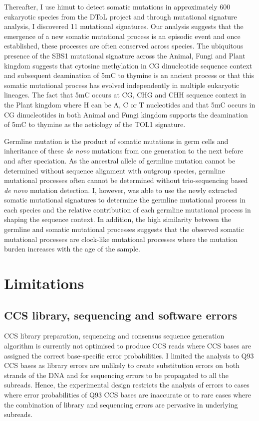 Thereafter, I use himut to detect somatic mutations in approximately 600 eukaryotic species from the DToL project and through mutational signature analysis, I discovered 11 mutational signatures. Our analysis suggests that the emergence of a new somatic mutational process is an episodic event and once established, these processes are often conserved across species. The ubiquitous presence of the SBS1 mutational signature across the Animal, Fungi and Plant kingdom suggests that cytosine methylation in CG dinucleotide sequence context and subsequent deamination of 5mC to thymine is an ancient process or that this somatic mutational process has evolved independently in multiple eukaryotic lineages. The fact that 5mC occurs at CG, CHG and CHH sequence context in the Plant kingdom where H can be A, C or T nucleotides \cite{Henderson2007-mm} and that 5mC occurs in CG dinucleotides in both Animal and Fungi kingdom \cite{Bewick2019-tu} supports the deamination of 5mC to thymine as the aetiology of the TOL1 signature. 

Germline mutation is the product of somatic mutations in germ cells and inheritance of these \textit{de novo} mutations from one generation to the next before and after speciation. As the ancestral allele of germline mutation cannot be determined without sequence alignment with outgroup species, germline mutational processes often cannot be determined without trio-sequencing based \textit{de novo} mutation detection. I, however, was able to use the newly extracted somatic mutational signatures to determine the germline mutational process in each species and the relative contribution of each germline mutational process in shaping the sequence context. In addition, the high similarity between the germline and somatic mutational processes suggests that the observed somatic mutational processes are clock-like mutational processes where the mutation burden increases with the age of the sample. 

\section{Limitations}

\subsection{CCS library, sequencing and software errors}

CCS library preparation, sequencing and consensus sequence generation algorithm is currently not optimised to produce CCS reads where CCS bases are assigned the correct base-specific error probabilities. I limited the analysis to Q93 CCS bases as library errors are unlikely to create substitution errors on both strands of the DNA and for sequencing errors to be propagated to all the subreads. Hence, the experimental design restricts the analysis of errors to cases where error probabilities of Q93 CCS bases are inaccurate or to rare cases where the combination of library and sequencing errors are pervasive in underlying subreads.

